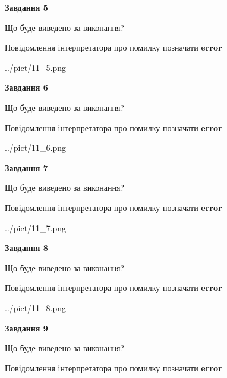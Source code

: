 \documentclass[11pt, ukrainian]{article}
\begin{document}
{\begin {large}
{\begin {center}\textbf{Завдання 5}\end {center}}\par
Що буде виведено за виконання? \par
Повідомлення інтерпретатора про помилку позначати \textbf{error}

\begin{center}
	{../pict/11_5.png}
\end{center}
\newpage

{\begin {center}\textbf{Завдання 6}\end {center}}\par
Що буде виведено за виконання? \par
Повідомлення інтерпретатора про помилку позначати \textbf{error}

\begin{center}
	{../pict/11_6.png}
\end{center}
\newpage

{\begin {center}\textbf{Завдання 7}\end {center}}\par
Що буде виведено за виконання? \par
Повідомлення інтерпретатора про помилку позначати \textbf{error}

\begin{center}
	{../pict/11_7.png}
\end{center}
\newpage

{\begin {center}\textbf{Завдання 8}\end {center}}\par
Що буде виведено за виконання? \par
Повідомлення інтерпретатора про помилку позначати \textbf{error}

\begin{center}
	{../pict/11_8.png}
\end{center}
\newpage

{\begin {center}\textbf{Завдання 9}\end {center}}\par
Що буде виведено за виконання? \par
Повідомлення інтерпретатора про помилку позначати \textbf{error}


\end{large}}
\end{document}

